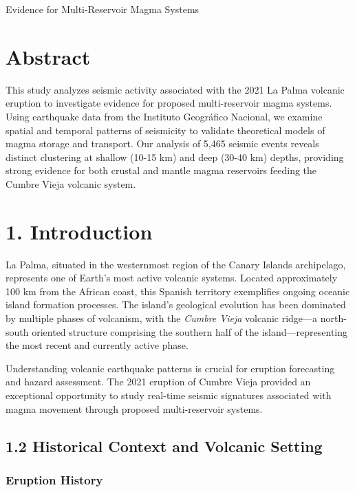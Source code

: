 \documentclass[
  letterpaper,
]{article}
\begin{document}
Evidence for Multi-Reservoir Magma Systems

\hfill\break

\label{abstract}

\chapter{Abstract}\label{abstract}

This study analyzes seismic activity associated with the 2021 La Palma
volcanic eruption to investigate evidence for proposed multi-reservoir
magma systems. Using earthquake data from the Instituto Geográfico
Nacional, we examine spatial and temporal patterns of seismicity to
validate theoretical models of magma storage and transport. Our analysis
of 5,465 seismic events reveals distinct clustering at shallow (10-15
km) and deep (30-40 km) depths, providing strong evidence for both
crustal and mantle magma reservoirs feeding the Cumbre Vieja volcanic
system.


\chapter{1. Introduction}\label{introduction}

La Palma, situated in the westernmost region of the Canary Islands
archipelago, represents one of Earth's most active volcanic systems.
Located approximately 100 km from the African coast, this Spanish
territory exemplifies ongoing oceanic island formation processes. The
island's geological evolution has been dominated by multiple phases of
volcanism, with the \emph{Cumbre Vieja} volcanic ridge---a north-south
oriented structure comprising the southern half of the
island---representing the most recent and currently active phase.

Understanding volcanic earthquake patterns is crucial for eruption
forecasting and hazard assessment. The 2021 eruption of Cumbre Vieja
provided an exceptional opportunity to study real-time seismic
signatures associated with magma movement through proposed
multi-reservoir systems.

\section{1.2 Historical Context and Volcanic
Setting}\label{historical-context-and-volcanic-setting}

\subsection{Eruption History}\label{eruption-history}
\end{document}
